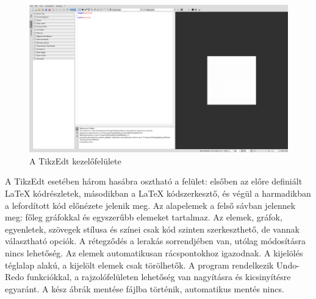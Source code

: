 \begin{figure}[!h]
	\includegraphics[width=\textwidth]{images/tikzedt.png}
	\caption{A TikzEdt kezelőfelülete}
\label{fig:tikzedt}
\end{figure}
A TikzEdt esetében három hasábra osztható a felület: elsőben az előre definiált LaTeX kódrészletek, másodikban a LaTeX kódszerkesztő, és végül a harmadikban a lefordított kód előnézete jelenik meg. Az alapelemek a felső sávban jelennek meg: főleg gráfokkal és egyszerűbb elemeket tartalmaz. Az elemek, gráfok, egyenletek, szövegek stílusa és színei csak kód szinten szerkeszthető, de vannak választható opciók. A rétegződés a lerakás sorrendjében van, utólag módosításra nincs lehetőség. Az elemek automatikusan rácspontokhoz igazodnak. A kijelölés téglalap alakú, a kijelölt elemek csak törölhetők.  A program rendelkezik Undo-Redo funkciókkal, a rajzolófelületen lehetőség van nagyításra és kicsinyítésre egyaránt. A kész ábrák mentése fájlba történik, automatikus mentés nincs.

